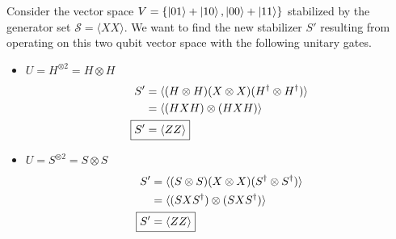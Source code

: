 Consider the vector space $V = \{\ket{01} + \ket{10}, \ket{00} + \ket{11}\}$ stabilized by the generator set $\mathcal{S} = \langle XX \rangle$. We want to find the new stabilizer $S'$ resulting from operating on this two qubit vector space with the following unitary gates. 
\begin{itemize}
    \item $U = H^{\otimes 2} = H \otimes H$ 
    \begin{align}
        S' &= \langle(H \otimes H)(X \otimes X)(H^\dagger \otimes H^\dagger)\rangle \\
        &= \langle (HXH)\otimes (HXH)\rangle \\
        \Aboxed{S' &= \langle ZZ\rangle}
    \end{align}
    
    \item $U = S^{\otimes 2} = S \otimes S$ 
    \begin{align}
        S' &= \langle(S \otimes S)(X \otimes X)(S^\dagger \otimes S^\dagger)\rangle \\
        &= \langle (SXS^\dagger)\otimes (SXS^\dagger)\rangle \\
        \Aboxed{S' &= \langle ZZ\rangle}
    \end{align}
    

\end{itemize}
